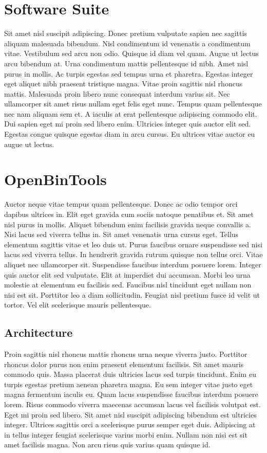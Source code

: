 \documentclass[a4paper,12pt]{article}
\begin{document}
\begin{multicols}{2}
\section{Software Suite}
Sit amet nisl suscipit adipiscing. Donec pretium vulputate sapien nec sagittis aliquam malesuada bibendum. Nisl condimentum id venenatis a condimentum vitae. Vestibulum sed arcu non odio. Quisque id diam vel quam. Augue ut lectus arcu bibendum at. Urna condimentum mattis pellentesque id nibh. Amet nisl purus in mollis. Ac turpis egestas sed tempus urna et pharetra. Egestas integer eget aliquet nibh praesent tristique magna. Vitae proin sagittis nisl rhoncus mattis. Malesuada proin libero nunc consequat interdum varius sit. Nec ullamcorper sit amet risus nullam eget felis eget nunc. Tempus quam pellentesque nec nam aliquam sem et. A iaculis at erat pellentesque adipiscing commodo elit. Dui sapien eget mi proin sed libero enim. Ultricies integer quis auctor elit sed. Egestas congue quisque egestas diam in arcu cursus. Eu ultrices vitae auctor eu augue ut lectus.


\section{OpenBinTools}
Auctor neque vitae tempus quam pellentesque. Donec ac odio tempor orci dapibus ultrices in. Elit eget gravida cum sociis natoque penatibus et. Sit amet nisl purus in mollis. Aliquet bibendum enim facilisis gravida neque convallis a. Nisi lacus sed viverra tellus in. Sit amet venenatis urna cursus eget. Tellus elementum sagittis vitae et leo duis ut. Purus faucibus ornare suspendisse sed nisi lacus sed viverra tellus. In hendrerit gravida rutrum quisque non tellus orci. Vitae aliquet nec ullamcorper sit. Suspendisse faucibus interdum posuere lorem. Integer quis auctor elit sed vulputate. Elit at imperdiet dui accumsan. Morbi leo urna molestie at elementum eu facilisis sed. Faucibus nisl tincidunt eget nullam non nisi est sit. Porttitor leo a diam sollicitudin. Feugiat nisl pretium fusce id velit ut tortor. Vel elit scelerisque mauris pellentesque.

\subsection{Architecture}
Proin sagittis nisl rhoncus mattis rhoncus urna neque viverra justo. Porttitor rhoncus dolor purus non enim praesent elementum facilisis. Sit amet mauris commodo quis. Massa placerat duis ultricies lacus sed turpis tincidunt. Enim eu turpis egestas pretium aenean pharetra magna. Eu sem integer vitae justo eget magna fermentum iaculis eu. Quam lacus suspendisse faucibus interdum posuere lorem. Risus commodo viverra maecenas accumsan lacus vel facilisis volutpat est. Eget mi proin sed libero. Sit amet nisl suscipit adipiscing bibendum est ultricies integer. Ultrices sagittis orci a scelerisque purus semper eget duis. Adipiscing at in tellus integer feugiat scelerisque varius morbi enim. Nullam non nisi est sit amet facilisis magna. Non arcu risus quis varius quam quisque id.


\end{multicols}
\end{document}
